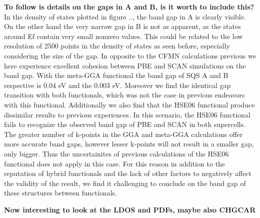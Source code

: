 \textbf{To follow is details on the gaps in A and B, is it worth to include this?}
In the density of states plotted in figure .., the band gap in A is clearly visible. On the other hand the very narrow gap in B is not as apparent, as the states around Ef contain very small nonzero values.  This could be related to the low resolution of 2500 points in the density of states as seen before, especially considering the size of the gap. In opposite to the CFMN calculations previous we here experience excellent cohesion between PBE and SCAN simulations on the band gap. With the meta-GGA functional the band gap of SQS A and B respective is 0.04 eV and the 0.003 eV. Moreover we find the identical gap transition with both functionals, which was not the case in previous endeavors with this functional. Additionally we also find that the HSE06 functional produce dissimilar results to previous experiences. In this scenario, the HSE06 functional fails to recognize the observed band gap of PBE and SCAN in both supercells. The greater number of k-points in the GGA and meta-GGA calculations offer more accurate band gaps, however lesser k-points will not result in a smaller gap, only bigger. Thus the uncertainites of previous calculations of the HSE06 functional does not apply in this case. For this reason in addition to the reputation of hybrid functionals and the lack of other factors to negatively affect the validity of the result, we find it challenging to conclude on the band gap of these structures between functionals.

\textbf{Now interesting to look at the LDOS and PDFs, maybe also CHGCAR}